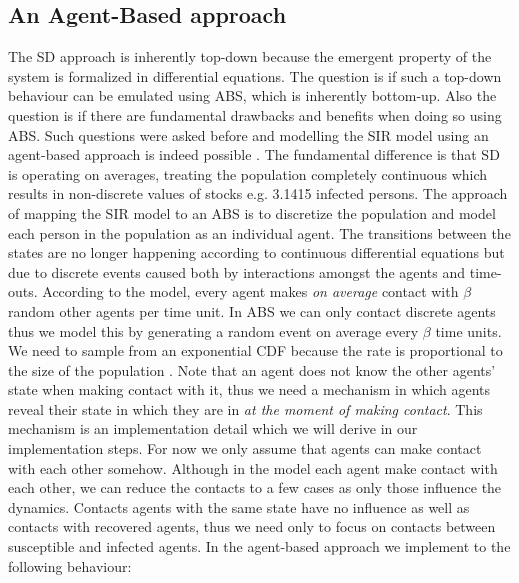 \subsection*{An Agent-Based approach}
The SD approach is inherently top-down because the emergent property of the system is formalized in differential equations. The question is if such a top-down behaviour can be emulated using ABS, which is inherently bottom-up. Also the question is if there are fundamental drawbacks and benefits when doing so using ABS. Such questions were asked before and modelling the SIR model using an agent-based approach is indeed possible \cite{macal_agent-based_2010}. The fundamental difference is that SD is operating on averages, treating the population completely continuous which results in non-discrete values of stocks e.g. 3.1415 infected persons. The approach of mapping the SIR model to an ABS is to discretize the population and model each person in the population as an individual agent. The transitions between the states are no longer happening according to continuous differential equations but due to discrete events caused both by interactions amongst the agents and time-outs.
According to the model, every agent makes \textit{on average} contact with $\beta$ random other agents per time unit. In ABS we can only contact discrete agents thus we model this by generating a random event on average every $\beta$ time units. We need to sample from an exponential CDF because the rate is proportional to the size of the population \cite{borshchev_system_2004}. Note that an agent does not know the other agents' state when making contact with it, thus we need a mechanism in which agents reveal their state in which they are in \textit{at the moment of making contact}. This mechanism is an implementation detail which we will derive in our implementation steps. For now we only assume that agents can make contact with each other somehow. 
Although in the model each agent make contact with each other, we can reduce the contacts to a few cases as only those influence the dynamics. Contacts agents with the same state have no influence as well as contacts with recovered agents, thus we need only to focus on contacts between susceptible and infected agents. In the agent-based approach we implement to the following behaviour:

